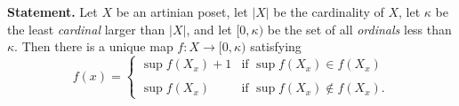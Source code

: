 \documentclass[12pt,letterpaper]{article}
\newcommand{\nn}{\noindent}
\begin{document}
\nn\textbf{Statement.} Let $X$ be an artinian poset, let $|X|$ be the cardinality of $X$, let $\kappa$ be the least \emph{cardinal} larger than $|X|$, and let $[0,\kappa)$ be the set of all \emph{ordinals} less than $\kappa$. Then there is a unique map $f:X\to[0,\kappa)$ satisfying %
$$
f(x)=
\begin{cases}
\sup f(X_x)+1&\text{if }\sup f(X_x)\in f(X_x)\\ \\ 
\sup f(X_x)&\text{if }\sup f(X_x)\notin f(X_x).
\end{cases}
$$ 
\end{document}
